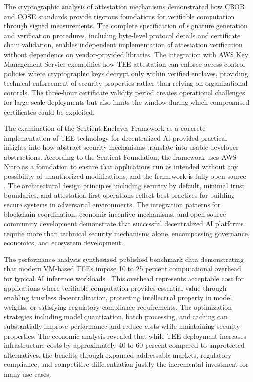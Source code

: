 The cryptographic analysis of attestation mechanisms demonstrated how CBOR and COSE standards provide rigorous foundations for verifiable computation through signed measurements. The complete specification of signature generation and verification procedures, including byte-level protocol details and certificate chain validation, enables independent implementation of attestation verification without dependence on vendor-provided libraries. The integration with AWS Key Management Service exemplifies how TEE attestation can enforce access control policies where cryptographic keys decrypt only within verified enclaves, providing technical enforcement of security properties rather than relying on organizational controls. The three-hour certificate validity period creates operational challenges for large-scale deployments but also limits the window during which compromised certificates could be exploited.

The examination of the Sentient Enclaves Framework as a concrete implementation of TEE technology for decentralized AI provided practical insights into how abstract security mechanisms translate into usable developer abstractions. According to the Sentient Foundation, the framework uses AWS Nitro as a foundation to ensure that applications run as intended without any possibility of unauthorized modifications, and the framework is fully open source \cite{sentient_announcement}. The architectural design principles including security by default, minimal trust boundaries, and attestation-first operations reflect best practices for building secure systems in adversarial environments. The integration patterns for blockchain coordination, economic incentive mechanisms, and open source community development demonstrate that successful decentralized AI platforms require more than technical security mechanisms alone, encompassing governance, economics, and ecosystem development.

The performance analysis synthesized published benchmark data demonstrating that modern VM-based TEEs impose 10 to 25 percent computational overhead for typical AI inference workloads \cite{tee_evolution}. This overhead represents acceptable cost for applications where verifiable computation provides essential value through enabling trustless decentralization, protecting intellectual property in model weights, or satisfying regulatory compliance requirements. The optimization strategies including model quantization, batch processing, and caching can substantially improve performance and reduce costs while maintaining security properties. The economic analysis revealed that while TEE deployment increases infrastructure costs by approximately 40 to 60 percent compared to unprotected alternatives, the benefits through expanded addressable markets, regulatory compliance, and competitive differentiation justify the incremental investment for many use cases.


